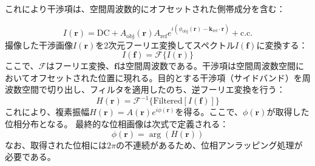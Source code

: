 これにより干渉項は、空間周波数的にオフセットされた側帯成分を含む：

\begin{equation}
I(\bm{r}) = \text{DC} + A_{\mathrm{obj}}(\bm{r}) A_{\mathrm{ref}} e^{i (\phi_{\mathrm{obj}}(\bm{r}) - \bm{k}_{\mathrm{ref}} \cdot \bm{r})} + \text{c.c.}
\end{equation}
撮像した干渉画像$I(\bm{r})$を2次元フーリエ変換してスペクトル$I(\bm{f})$に変換する：
\begin{equation}
I(\bm{f}) = \mathcal{F}\{ I(\bm{r}) \}
\end{equation}
ここで、$\mathcal{F}$はフーリエ変換、$\bm{f}$は空間周波数である。干渉項は空間周波数空間においてオフセットされた位置に現れる。目的とする干渉項（サイドバンド）を周波数空間で切り出し、フィルタを適用したのち、逆フーリエ変換を行う：
\begin{equation}
H(\bm{r}) = \mathcal{F}^{-1}\{ \text{Filtered}[I(\bm{f})] \}
\end{equation}
これにより、複素振幅$H(\bm{r}) = A(\bm{r}) e^{i \phi(\bm{r})}$を得る。ここで、$\phi(\bm{r})$が取得した位相分布となる。
最終的な位相画像は次式で定義される：
\begin{equation}
\phi(\bm{r}) = \arg \left( H(\bm{r}) \right)
\end{equation}
なお、取得された位相には$2\pi$の不連続があるため、位相アンラッピング処理が必要である。

